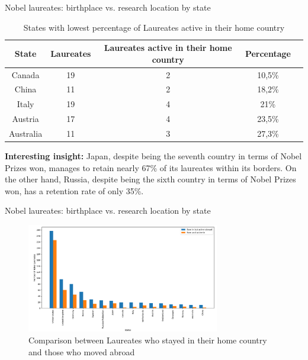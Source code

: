 \documentclass[aspectratio=169,xcolor=dvipsnames]{beamer}
\begin{document}
\begin{frame}{Nobel laureates: birthplace vs. research location by state}
	\begin{table}[h!]
		\centering
		\caption{States with lowest percentage of Laureates active in their home country}
		\begin{tabular}{|c|c|c|c|c|}
			\hline
			\textbf{State} & \textbf{Laureates} & \textbf{Laureates active in their home country} & \textbf{Percentage} \\ \hline
			Canada         & 19                 & 2                                               & 10,5\%              \\ \hline
			China          & 11                 & 2                                               & 18,2\%              \\ \hline
			Italy          & 19                 & 4                                               & 21\%                \\ \hline
			Austria        & 17                 & 4                                               & 23,5\%              \\ \hline
			Australia      & 11                 & 3                                               & 27,3\%              \\ \hline
		\end{tabular}
		\label{tab:laureates_active}
	\end{table}

	\textbf{Interesting insight:} Japan, despite being the seventh country in terms of Nobel
Prizes won, manages to retain nearly 67\% of its laureates within its borders. On the other hand, Russia, despite
being the sixth country in terms of Nobel Prizes won, has a retention rate of only 35\%.

\end{frame}

\begin{frame}{Nobel laureates: birthplace vs. research location by state}
	\begin{figure}[H]
		\centering
		\includegraphics[width=0.75\textwidth]{../queries/plots/laureatesComparison.png}
		\caption{Comparison between Laureates who stayed in their home country and those who moved abroad}
		\label{fig:laureatesComparison}
	\end{figure}
\end{frame}
\end{document}
